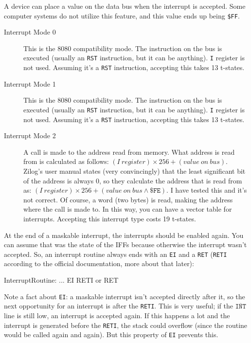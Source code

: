 A device can place a value on the data bus when the interrupt is accepted. Some computer systems do not utilize this feature, and this value ends up being {\tt \$FF}.

\begin{description}

	\item[Interrupt Mode 0]
	This is the 8080 compatibility mode. The instruction on the bus is executed (usually an {\tt RST} instruction, but it can be anything). {\tt I} register is not used. Assuming it's a {\tt RST} instruction, accepting this takes 13 t-states.

	\item[Interrupt Mode 1]
	This is the 8080 compatibility mode. The instruction on the bus is executed (usually an {\tt RST} instruction, but it can be anything). {\tt I} register is not used. Assuming it's a {\tt RST} instruction, accepting this takes 13 t-states.

	\item[Interrupt Mode 2]
	A call is made to the address read from memory. What address is read from is calculated as follows: $(I\ register) \times 256 + (value\ on\ bus)$. Zilog's user manual states (very convincingly) that the least significant bit of the address is always 0, so they calculate the address that is read from as: $(I\ register) \times 256 + (value\ on\ bus \wedge \mathtt{\$FE})$. I have tested this and it's not correct. Of course, a word (two bytes) is read, making the address where the call is made to. In this way, you can have a vector table for interrupts. Accepting this interrupt type costs 19 t-states.

\end{description}

At the end of a maskable interrupt, the interrupts should be enabled again. You can assume that was the state of the IFFs because otherwise the interrupt wasn't accepted. So, an interrupt routine always ends with an {\tt EI} and a {\tt RET} ({\tt RETI} according to the official documentation, more about that later):

\begin{tcblisting}{}
InterruptRoutine:
	...
	EI
	RETI or RET
\end{tcblisting}

Note a fact about {\tt EI}: a maskable interrupt isn't accepted directly after it, so the next opportunity for an interrupt is after the {\tt RETI}. This is very useful; if the $\mathtt{\overline{INT}}$ line is still low, an interrupt is accepted again.  If this happens a lot and the interrupt is generated before the {\tt RETI}, the stack could overflow (since the routine would be called again and again). But this property of {\tt EI} prevents this.

